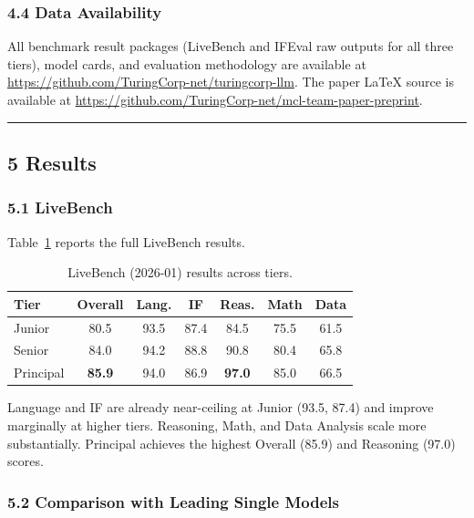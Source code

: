 \documentclass[
]{article}
\begin{document}
\subsubsection{4.4 Data Availability}\label{data-availability}

All benchmark result packages (LiveBench and IFEval raw outputs for all three tiers), model cards, and evaluation methodology are available at \url{https://github.com/TuringCorp-net/turingcorp-llm}. The paper LaTeX source is available at \url{https://github.com/TuringCorp-net/mcl-team-paper-preprint}.

\begin{center}\rule{0.5\linewidth}{0.5pt}\end{center}

\subsection{5 Results}\label{results}

\subsubsection{5.1 LiveBench}\label{livebench-results}

Table~\ref{tab:livebench} reports the full LiveBench results.

\begin{table}[H]
\centering
\caption{LiveBench (2026-01) results across tiers.}
\label{tab:livebench}
\begin{tabular}{@{}lcccccc@{}}
\toprule
\textbf{Tier} & \textbf{Overall} & \textbf{Lang.} & \textbf{IF} & \textbf{Reas.} & \textbf{Math} & \textbf{Data} \\
\midrule
Junior  & 80.5 & 93.5 & 87.4 & 84.5 & 75.5 & 61.5 \\
Senior  & 84.0 & 94.2 & 88.8 & 90.8 & 80.4 & 65.8 \\
Principal & \textbf{85.9} & 94.0 & 86.9 & \textbf{97.0} & 85.0 & 66.5 \\
\bottomrule
\end{tabular}
\end{table}

Language and IF are already near-ceiling at Junior (93.5, 87.4) and improve marginally at higher tiers. Reasoning, Math, and Data Analysis scale more substantially. Principal achieves the highest Overall (85.9) and Reasoning (97.0) scores.

\subsubsection{5.2 Comparison with Leading Single Models}\label{comparison}
\end{document}
